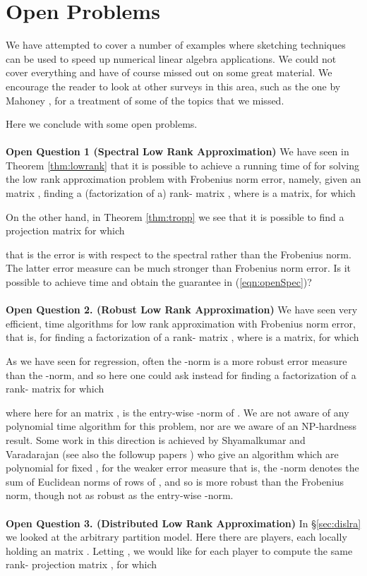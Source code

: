 \documentclass[11pt]{article}
\begin{document}
\section{Open Problems}
We have attempted to cover a number of examples where sketching techniques can be used to speed
up numerical linear algebra applications. We could not cover everything and have of course missed out
on some great material. We encourage the reader to look at other surveys in this area, such
as the one by Mahoney \cite{m11}, for a treatment of some of the topics that we missed. 

Here we conclude with some open problems.
\\\\
{\bf Open Question 1 (Spectral Low Rank Approximation)} We have seen in Theorem \ref{thm:lowrank} 
that it is possible to achieve a running time of 
 for solving the low rank approximation problem
with Frobenius norm error, namely, given an  matrix , finding a (factorization of a) 
rank- matrix , where  is a  matrix, for which 

On the other hand, in Theorem \ref{thm:tropp} we see that it is possible to find a projection matrix
 for which

that is the error is with respect to the spectral rather than the Frobenius norm. The latter error
measure can be much stronger than Frobenius norm error. Is it possible to achieve 
time and obtain the guarantee in (\ref{eqn:openSpec})?
\\\\
{\bf Open Question 2. (Robust Low Rank Approximation)} 
We have seen very efficient,  time algorithms
for low rank approximation with Frobenius norm error, that is, for finding a factorization of a rank- matrix
, where  is a  matrix, for which 

As we have seen for regression, often the -norm is a more robust error measure than the -norm, and
so here one could ask instead for finding a factorization of a rank- matrix  for which

where here for an  matrix ,  is the entry-wise -norm of 
. We are not aware of any polynomial time algorithm for this problem, nor are we aware of an NP-hardness
result. Some work in this direction is achieved by Shyamalkumar and Varadarajan \cite{SV07} 
(see also the followup papers \cite{DV07,FMSW10,FL11,VX12}) who give an algorithm which
are polynomial for fixed , for the weaker error measure  that is,
the -norm denotes the sum of Euclidean norms of rows of , and so is more robust than the Frobenius norm,
though not as robust as the entry-wise -norm. 
\\\\
{\bf Open Question 3. (Distributed Low Rank Approximation)}
In \S\ref{sec:dislra} we looked at the arbitrary partition model. Here there
are  players, 
each locally holding an  
matrix . Letting , 
we would like for each player to compute the same rank- projection
matrix , for which 
\end{document}
